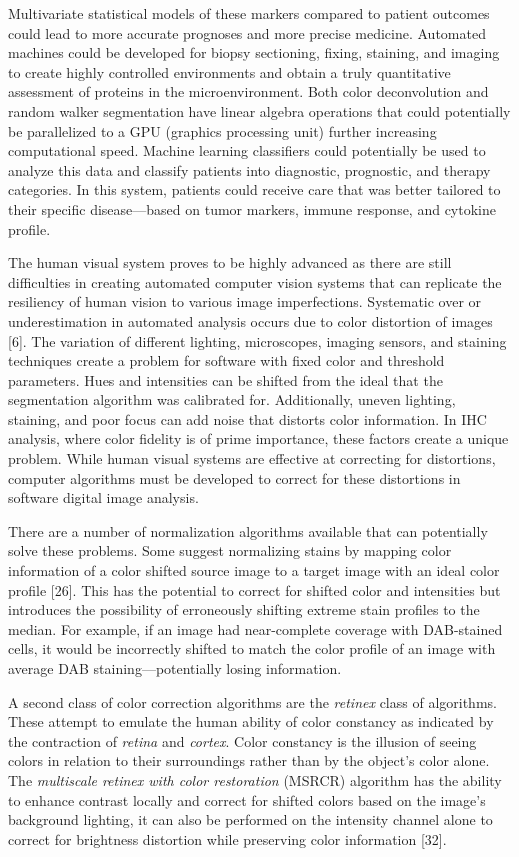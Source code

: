 \documentclass[12pt]{article}
\begin{document}
Multivariate statistical models of these markers compared to patient outcomes could lead to
more accurate prognoses and more precise medicine. Automated machines could be developed for
biopsy sectioning, fixing, staining, and imaging to create highly controlled environments and obtain a
truly quantitative assessment of proteins in the microenvironment. Both color deconvolution and
random walker segmentation have linear algebra operations that could potentially be parallelized to a GPU (graphics processing unit) further increasing computational speed. Machine learning classifiers
could potentially be used to analyze this data and classify patients into diagnostic, prognostic, and
therapy categories. In this system, patients could receive care that was better tailored to their specific disease---based
on tumor markers, immune response, and cytokine profile.

The human visual system proves to be highly advanced as there are still difficulties in creating
automated computer vision systems that can replicate the resiliency of human vision to various image
imperfections. Systematic over or underestimation in automated analysis occurs due to color distortion
of images [6]. The variation of different lighting, microscopes, imaging sensors, and staining techniques create a problem for software with fixed color and threshold parameters. Hues and intensities can be shifted from the ideal that the segmentation algorithm was calibrated for. Additionally, uneven lighting, staining, and poor focus can add noise that distorts color information. In
IHC analysis, where color fidelity is of prime importance, these factors create a unique problem. While human visual systems are effective at correcting for distortions, computer algorithms must be developed to correct for these distortions in software digital image analysis.

There are a number of normalization algorithms available that can potentially solve these
problems. Some suggest normalizing stains by mapping color information of a color shifted source
image to a target image with an ideal color profile [26]. This has the potential to correct for shifted
color and intensities but introduces the possibility of erroneously shifting extreme stain profiles to the median. For example, if an image had near-complete coverage with DAB-stained cells, it would be incorrectly shifted to match the color profile of an image with average DAB staining---potentially
losing information.

A second class of color correction algorithms are the \textit{retinex} class of algorithms. These attempt to emulate the human ability of color constancy as indicated by the contraction of \textit{retina} and \textit{cortex}. Color constancy is the illusion of seeing colors in relation to their surroundings rather than by the object’s color alone. The \textit{multiscale retinex with color restoration} (MSRCR) algorithm has the ability to enhance contrast locally and correct for shifted colors based on the image’s background lighting, it can also be performed on the intensity channel alone to correct for brightness distortion while preserving color information [32].
\end{document}
